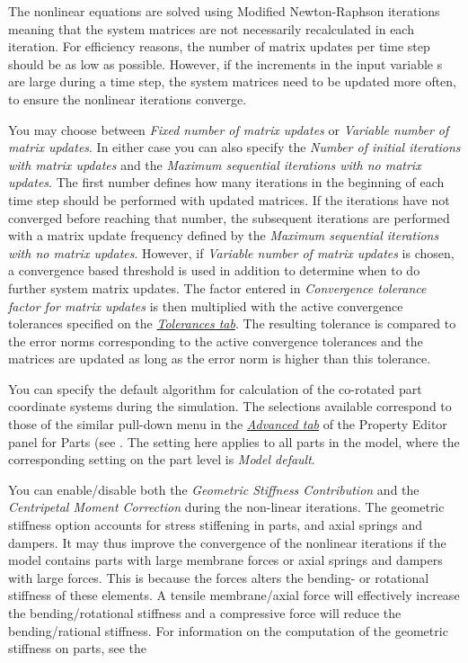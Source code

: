 \begin{bulletlist}
  \setcounter{enumi}{2}
\item
  The nonlinear equations are solved using Modified Newton-Raphson iterations
  meaning that the system matrices are not necessarily recalculated in each
  iteration. For efficiency reasons, the number of matrix updates per time step
  should be as low as possible. However, if the increments in the input variable
  s are large during a time step, the system matrices need to be updated more
  often, to ensure the nonlinear iterations converge.

  You may choose between {\sl Fixed number of matrix updates} or
  {\sl Variable number of matrix updates}. In either case you can also specify
  the {\sl Number of initial iterations with matrix updates} and
  the {\sl Maximum sequential iterations with no matrix updates}.
  The first number defines how many iterations in the beginning of each time
  step should be performed with updated matrices. If the iterations have not
  converged before reaching that number, the subsequent iterations are performed
  with a matrix update frequency defined by the
  {\sl Maximum sequential iterations with no matrix updates}.
  However, if {\sl Variable number of matrix updates} is chosen,
  a convergence based threshold is used in addition to determine when to
  do further system matrix updates.
  The factor entered in {\sl Convergence tolerance factor for matrix updates}
  is then multiplied with the active convergence tolerances specified on the
  \protect\hyperlink{tolerances-tab}{\sl Tolerances tab}.
  The resulting tolerance is compared to the error norms corresponding to the
  active convergence tolerances and the matrices are updated
  as long as the error norm is higher than this tolerance.

\item You can specify the default algorithm for
  calculation of the co-rotated part coordinate systems during the simulation.
  The selections available correspond to those of the similar pull-down menu in
  the \protect\hyperlink{advanced-tab}{\sl Advanced tab} of the Property Editor
  panel for Parts (see .
  The setting here applies to all parts in the model, where the corresponding
  setting on the part level is {\sl Model default}.

\item You can enable/disable both the
  {\sl Geometric Stiffness Contribution} and the
  {\sl Centripetal Moment Correction} during the non-linear iterations.
  The geometric stiffness option accounts for stress stiffening in parts,
  and axial springs and dampers. It may thus improve the convergence of
  the nonlinear iterations if the model contains parts with large membrane
  forces or axial springs and dampers with large forces. This is because
  the forces alters the bending- or rotational stiffness of these elements.
  A tensile membrane/axial force will effectively increase the
  bending/rotational stiffness and a compressive force will reduce the
  bending/rational stiffness. For information on the computation of the
  geometric stiffness on parts, see the


\end{bulletlist}
